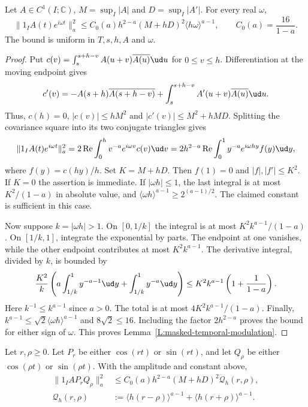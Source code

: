 \begin{lemma}\label{L:masked-temporal-modulation}
  Let $A \in C^1(I;\mathbb C)$, $M = \sup_I|A|$ and $D = \sup_I|A'|$.
  For every real $\omega$,
  \begin{equation}\label{E:masked-temporal-modulation}
    \|1_IA(t)e^{i\omega t}\|_a^2
    \le C_0(a)h^{2-a}(M+hD)^2\langle h\omega\rangle^{a-1},
    \qquad C_0(a) = \frac{16}{1-a}.
  \end{equation}
  The bound is uniform in $T,s,h,A$ and $\omega$.
\end{lemma}

\begin{proof}
  Put $c(v) = \int_s^{s+h-v}A(u+v)\overline{A(u)}\ud u$ for
  $0 \le v \le h$. Differentiation at the moving endpoint gives
  \[
    c'(v) = -A(s+h)\overline{A(s+h-v)}
    +\int_s^{s+h-v}A'(u+v)\overline{A(u)}\ud u.
  \]
  Thus, $c(h) = 0$, $|c(v)| \le hM^2$ and
  $|c'(v)| \le M^2+hMD$. Splitting the covariance square into its two
  conjugate triangles gives
  \[
    \|1_IA(t)e^{i\omega t}\|_a^2
    = 2\operatorname{Re}\int_0^h v^{-a}e^{i\omega v}c(v)\ud v
    = 2h^{2-a}\operatorname{Re}\int_0^1 y^{-a}e^{i\omega hy}f(y)\ud y,
  \]
  where $f(y) = c(hy)/h$. Set $K = M+hD$. Then $f(1) = 0$ and
  $|f|,|f'| \le K^2$. If $K = 0$ the assertion is immediate. If
  $|\omega h| \le 1$, the last integral is at most $K^2/(1-a)$ in
  absolute value, and $\langle\omega h\rangle^{a-1} \ge 2^{(a-1)/2}$.
  The claimed constant is sufficient in this case.

  Now suppose $k = |\omega h| > 1$. On $[0,1/k]$ the integral is at most
  $K^2k^{a-1}/(1-a)$. On $[1/k,1]$, integrate the exponential by parts.
  The endpoint at one vanishes, while the other endpoint contributes at
  most $K^2k^{a-1}$. The derivative integral, divided by $k$, is bounded by
  \[
    \frac{K^2}k\left(a\int_{1/k}^1 y^{-a-1}\ud y
    +\int_{1/k}^1 y^{-a}\ud y\right)
    \le K^2 k^{a-1}\left(1+\frac1{1-a}\right).
  \]
  Here $k^{-1} \le k^{a-1}$ since $a > 0$. The total is at most
  $4K^2k^{a-1}/(1-a)$. Finally,
  $k^{a-1} \le \sqrt{2}\langle\omega h\rangle^{a-1}$ and
  $8\sqrt{2} \le 16$. Including the factor $2h^{2-a}$ proves the bound
  for either sign of $\omega$.
  This proves Lemma~\ref{L:masked-temporal-modulation}.
\end{proof}

\begin{lemma}\label{L:masked-trig-products}
  Let $r,\rho \ge 0$. Let $P_r$ be either $\cos(rt)$ or $\sin(rt)$,
  and let $Q_\rho$ be either $\cos(\rho t)$ or $\sin(\rho t)$.
  With the amplitude and constant above,
  \begin{align}
    \|1_IAP_rQ_\rho\|_a^2
    &\le C_0(a)h^{2-a}(M+hD)^2\mathcal Q_h(r,\rho),
    \label{E:masked-trig-products}\\
    \mathcal Q_h(r,\rho)
    &:= \langle h(r-\rho)\rangle^{a-1}
    +\langle h(r+\rho)\rangle^{a-1}.
    \label{E:masked-frequency-pair}
  \end{align}
\end{lemma}

